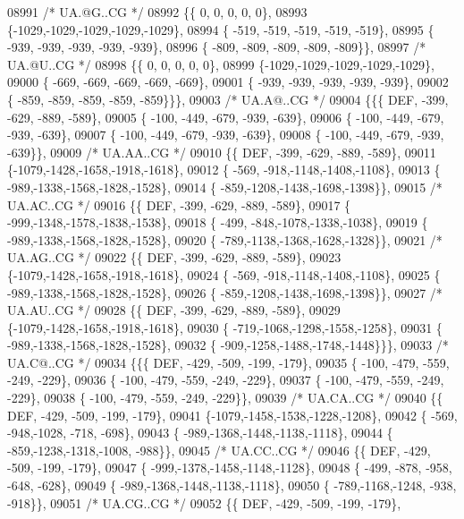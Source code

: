 \begin{DoxyCode}
08991 \textcolor{comment}{/* UA.@G..CG */}
08992 \{\{    0,    0,    0,    0,    0\},
08993 \{-1029,-1029,-1029,-1029,-1029\},
08994 \{ -519, -519, -519, -519, -519\},
08995 \{ -939, -939, -939, -939, -939\},
08996 \{ -809, -809, -809, -809, -809\}\},
08997 \textcolor{comment}{/* UA.@U..CG */}
08998 \{\{    0,    0,    0,    0,    0\},
08999 \{-1029,-1029,-1029,-1029,-1029\},
09000 \{ -669, -669, -669, -669, -669\},
09001 \{ -939, -939, -939, -939, -939\},
09002 \{ -859, -859, -859, -859, -859\}\}\},
09003 \textcolor{comment}{/* UA.A@..CG */}
09004 \{\{\{  DEF, -399, -629, -889, -589\},
09005 \{ -100, -449, -679, -939, -639\},
09006 \{ -100, -449, -679, -939, -639\},
09007 \{ -100, -449, -679, -939, -639\},
09008 \{ -100, -449, -679, -939, -639\}\},
09009 \textcolor{comment}{/* UA.AA..CG */}
09010 \{\{  DEF, -399, -629, -889, -589\},
09011 \{-1079,-1428,-1658,-1918,-1618\},
09012 \{ -569, -918,-1148,-1408,-1108\},
09013 \{ -989,-1338,-1568,-1828,-1528\},
09014 \{ -859,-1208,-1438,-1698,-1398\}\},
09015 \textcolor{comment}{/* UA.AC..CG */}
09016 \{\{  DEF, -399, -629, -889, -589\},
09017 \{ -999,-1348,-1578,-1838,-1538\},
09018 \{ -499, -848,-1078,-1338,-1038\},
09019 \{ -989,-1338,-1568,-1828,-1528\},
09020 \{ -789,-1138,-1368,-1628,-1328\}\},
09021 \textcolor{comment}{/* UA.AG..CG */}
09022 \{\{  DEF, -399, -629, -889, -589\},
09023 \{-1079,-1428,-1658,-1918,-1618\},
09024 \{ -569, -918,-1148,-1408,-1108\},
09025 \{ -989,-1338,-1568,-1828,-1528\},
09026 \{ -859,-1208,-1438,-1698,-1398\}\},
09027 \textcolor{comment}{/* UA.AU..CG */}
09028 \{\{  DEF, -399, -629, -889, -589\},
09029 \{-1079,-1428,-1658,-1918,-1618\},
09030 \{ -719,-1068,-1298,-1558,-1258\},
09031 \{ -989,-1338,-1568,-1828,-1528\},
09032 \{ -909,-1258,-1488,-1748,-1448\}\}\},
09033 \textcolor{comment}{/* UA.C@..CG */}
09034 \{\{\{  DEF, -429, -509, -199, -179\},
09035 \{ -100, -479, -559, -249, -229\},
09036 \{ -100, -479, -559, -249, -229\},
09037 \{ -100, -479, -559, -249, -229\},
09038 \{ -100, -479, -559, -249, -229\}\},
09039 \textcolor{comment}{/* UA.CA..CG */}
09040 \{\{  DEF, -429, -509, -199, -179\},
09041 \{-1079,-1458,-1538,-1228,-1208\},
09042 \{ -569, -948,-1028, -718, -698\},
09043 \{ -989,-1368,-1448,-1138,-1118\},
09044 \{ -859,-1238,-1318,-1008, -988\}\},
09045 \textcolor{comment}{/* UA.CC..CG */}
09046 \{\{  DEF, -429, -509, -199, -179\},
09047 \{ -999,-1378,-1458,-1148,-1128\},
09048 \{ -499, -878, -958, -648, -628\},
09049 \{ -989,-1368,-1448,-1138,-1118\},
09050 \{ -789,-1168,-1248, -938, -918\}\},
09051 \textcolor{comment}{/* UA.CG..CG */}
09052 \{\{  DEF, -429, -509, -199, -179\},

\end{DoxyCode}
